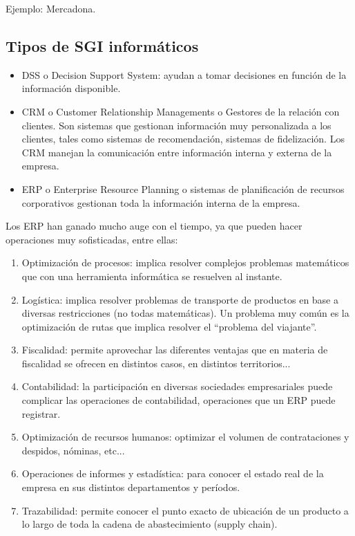 \documentclass[letterpaper,10pt,spanish]{sphinxmanual}
\begin{document}
Ejemplo: Mercadona.


\subsection{Tipos de SGI informáticos}
\label{tema8:tipos-de-sgi-informaticos}\begin{itemize}
\item {} 
DSS o Decision Support System: ayudan a tomar decisiones en función de la información disponible.

\item {} 
CRM o Customer Relationship Managements o Gestores de la relación con clientes. Son sistemas que gestionan información muy personalizada a los clientes, tales como sistemas de recomendación, sistemas de fidelización. Los CRM manejan la comunicación entre información interna y externa de la empresa.

\item {} 
ERP o Enterprise Resource Planning o sistemas de planificación de recursos corporativos gestionan toda la información interna de la empresa.

\end{itemize}

Los ERP han ganado mucho auge con el tiempo, ya que pueden hacer operaciones muy sofisticadas, entre ellas:
\begin{enumerate}
\item {} 
Optimización de procesos: implica resolver complejos problemas matemáticos que con una herramienta informática se resuelven al instante.

\item {} 
Logística: implica resolver problemas de transporte de productos en base a diversas restricciones (no todas matemáticas). Un problema muy común es la optimización de rutas que implica resolver el ``problema del viajante''.

\item {} 
Fiscalidad: permite aprovechar las diferentes ventajas que en materia de fiscalidad se ofrecen en distintos casos, en distintos territorios...

\item {} 
Contabilidad: la participación en diversas sociedades empresariales puede complicar las operaciones de contabilidad, operaciones que un ERP puede registrar.

\item {} 
Optimización de recursos humanos: optimizar el volumen de contrataciones y despidos, nóminas, etc...

\item {} 
Operaciones de informes y estadística: para conocer el estado real de la empresa en sus distintos departamentos y períodos.

\item {} 
Trazabilidad: permite conocer el punto exacto de ubicación de un producto a lo largo de toda la cadena de abastecimiento (supply chain).

\end{enumerate}
\end{document}
